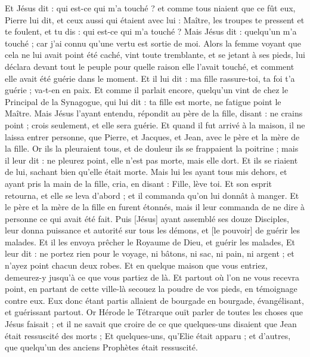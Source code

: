 \begin{multicols}{2}
Et Jésus dit : qui est-ce qui m'a touché ? et comme tous niaient que ce fût eux, Pierre lui dit, et ceux aussi qui étaient avec lui : Maître, les troupes te pressent et te foulent, et tu dis : qui est-ce qui m'a touché ?
Mais Jésus dit : quelqu'un m'a touché ; car j'ai connu qu'une vertu est sortie de moi.
Alors la femme voyant que cela ne lui avait point été caché, vint toute tremblante, et se jetant à ses pieds, lui déclara devant tout le peuple pour quelle raison elle l'avait touché, et comment elle avait été guérie dans le moment.
Et il lui dit : ma fille rassure-toi, ta foi t'a guérie ; va-t-en en paix.
Et comme il parlait encore, quelqu'un vint de chez le Principal de la Synagogue, qui lui dit : ta fille est morte, ne fatigue point le Maître.
Mais Jésus l'ayant entendu, répondit au père de la fille, disant : ne crains point ; crois seulement, et elle sera guérie.
Et quand il fut arrivé à la maison, il ne laissa entrer personne, que Pierre, et Jacques, et Jean, avec le père et la mère de la fille.
Or ils la pleuraient tous, et de douleur ils se frappaient la poitrine ; mais il leur dit : ne pleurez point, elle n'est pas morte, mais elle dort.
Et ils se riaient de lui, sachant bien qu'elle était morte.
Mais lui les ayant tous mis dehors, et ayant pris la main de la fille, cria, en disant : Fille, lève toi.
Et son esprit retourna, et elle se leva d'abord ; et il commanda qu'on lui donnât à manger.
Et le père et la mère de la fille en furent étonnés, mais il leur commanda de ne dire à personne ce qui avait été fait.
\VerseOne{}Puis [Jésus] ayant assemblé ses douze Disciples, leur donna puissance et autorité sur tous les démons, et [le pouvoir] de guérir les malades.
Et il les envoya prêcher le Royaume de Dieu, et guérir les malades,
Et leur dit : ne portez rien pour le voyage, ni bâtons, ni sac, ni pain, ni argent ; et n'ayez point chacun deux robes.
Et en quelque maison que vous entriez, demeurez-y jusqu'à ce que vous partiez de là.
Et partout où l'on ne vous recevra point, en partant de cette ville-là secouez la poudre de vos pieds, en témoignage contre eux.
Eux donc étant partis allaient de bourgade en bourgade, évangélisant, et guérissant partout.
Or Hérode le Tétrarque ouït parler de toutes les choses que Jésus faisait ; et il ne savait que croire de ce que quelques-uns disaient que Jean était ressuscité des morts ;
Et quelques-uns, qu'Elie était apparu ; et d'autres, que quelqu'un des anciens Prophètes était ressuscité.

\end{multicols}
